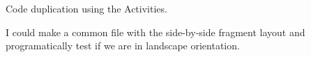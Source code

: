 

Code duplication using the Activities.

I could make a common file with the side-by-side fragment layout and programatically test
if we are in landscape orientation.